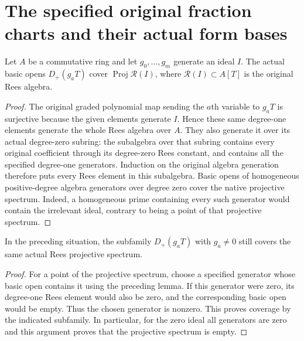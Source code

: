 \section{The specified original fraction charts and their actual form bases}

\begin{lemma}
\label{lem:resume-specified-generator-basic-cover}
\leanok
Let $A$ be a commutative ring and let $g_0,\ldots,g_m$ generate an ideal $I$.
The actual basic opens $D_+(g_aT)$ cover $\operatorname{Proj}\mathcal R(I)$,
where $\mathcal R(I)\subset A[T]$ is the original Rees algebra.
\end{lemma}
\begin{proof}
The original graded polynomial map sending the $a$th variable to $g_aT$
is surjective because the given elements generate $I$. Hence these same
degree-one elements generate the whole Rees algebra over $A$.
They also generate it over its actual degree-zero subring: the subalgebra
over that subring contains every original coefficient through its degree-zero
Rees constant, and contains all the specified degree-one generators.
Induction on the original algebra generation therefore puts every Rees element
in this subalgebra. Basic opens of homogeneous positive-degree algebra generators
over degree zero cover the native projective spectrum. Indeed, a homogeneous
prime containing every such generator would contain the irrelevant ideal,
contrary to being a point of that projective spectrum.
\end{proof}

\begin{lemma}
\label{lem:resume-specified-nonzero-generator-basic-cover}
\leanok
In the preceding situation, the subfamily $D_+(g_aT)$ with $g_a\ne0$ still
covers the same actual Rees projective spectrum.
\end{lemma}
\begin{proof}
For a point of the projective spectrum, choose a specified generator whose
basic open contains it using the preceding lemma. If this generator were zero,
its degree-one Rees element would also be zero, and the corresponding basic open
would be empty. Thus the chosen generator is nonzero. This proves coverage by
the indicated subfamily. In particular, for the zero ideal all generators are
zero and this argument proves that the projective spectrum is empty.
\end{proof}

